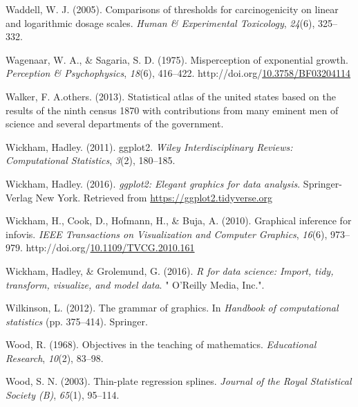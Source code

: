 \documentclass[print]{nuthesis}
\newlength{\cslhangindent}
\newenvironment{CSLReferences}%
{\setlength{\parindent}{0pt}%
\everypar{\setlength{\hangindent}{\cslhangindent}}\ignorespaces}%
{\par}
\begin{document}
\begin{CSLReferences}{1}{0}
\leavevmode{}%
Waddell, W. J. (2005). Comparisons of thresholds for carcinogenicity on linear and logarithmic dosage scales. \emph{Human \& Experimental Toxicology}, \emph{24}(6), 325--332.

\leavevmode{}%
Wagenaar, W. A., \& Sagaria, S. D. (1975). Misperception of exponential growth. \emph{Perception \& Psychophysics}, \emph{18}(6), 416--422. http://doi.org/\href{https://doi.org/10.3758/BF03204114}{10.3758/BF03204114}

\leavevmode{}%
Walker, F. A.others. (2013). Statistical atlas of the united states based on the results of the ninth census 1870 with contributions from many eminent men of science and several departments of the government.

\leavevmode{}%
Wickham, Hadley. (2011). ggplot2. \emph{Wiley Interdisciplinary Reviews: Computational Statistics}, \emph{3}(2), 180--185.

\leavevmode{}%
Wickham, Hadley. (2016). \emph{ggplot2: Elegant graphics for data analysis}. Springer-Verlag New York. Retrieved from \url{https://ggplot2.tidyverse.org}

\leavevmode{}%
Wickham, H., Cook, D., Hofmann, H., \& Buja, A. (2010). Graphical inference for infovis. \emph{IEEE Transactions on Visualization and Computer Graphics}, \emph{16}(6), 973--979. http://doi.org/\href{https://doi.org/10.1109/TVCG.2010.161}{10.1109/TVCG.2010.161}

\leavevmode{}%
Wickham, Hadley, \& Grolemund, G. (2016). \emph{R for data science: Import, tidy, transform, visualize, and model data}. " O'Reilly Media, Inc.".

\leavevmode{}%
Wilkinson, L. (2012). The grammar of graphics. In \emph{Handbook of computational statistics} (pp. 375--414). Springer.

\leavevmode{}%
Wood, R. (1968). Objectives in the teaching of mathematics. \emph{Educational Research}, \emph{10}(2), 83--98.

\leavevmode{}%
Wood, S. N. (2003). Thin-plate regression splines. \emph{Journal of the Royal Statistical Society (B)}, \emph{65}(1), 95--114.


\end{CSLReferences}
\end{document}
